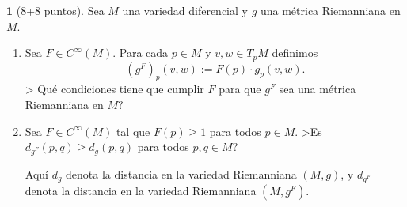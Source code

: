 \documentclass[12pt,a4paper]{report}
\theoremstyle{definition}
\newtheorem{ex}{}
\begin{document}
\begin{ex}[8+8 puntos]  Sea $M$ una variedad diferencial y $g$ una m\'etrica Riemanniana en $M$.
\begin{enumerate}
\item Sea $F \in C^{\infty}(M)$. Para cada $p\in M$ y $v,w\in T_pM$ definimos $$(g^F)_p(v,w):=F(p)\cdot g_p(v,w).$$
> Qu\'e condiciones tiene que cumplir $F$ para que $g^F$ sea una m\'etrica Riemanniana en $M$?
\item Sea $F \in C^{\infty}(M)$ tal que $F(p)\ge 1$ para todos $p\in M$.
>Es $d_{g^F}(p,q)\ge d_g(p,q)$ para todos $p,q\in M$?

Aqu\'i $d_g$ denota la distancia en la variedad Riemanniana $(M,g)$, y 
$d_{g^F}$ denota la distancia en la variedad Riemanniana $(M,g^F)$.
\end{enumerate}
\end{ex}



 

 

 
\end{document}
